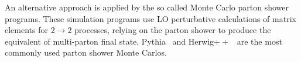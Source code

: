 An alternative approach is applied by the so called Monte Carlo parton shower programs. These simulation programs use LO perturbative calculations of matrix elements for $2 \rightarrow 2$ processes, relying on the parton shower to produce the equivalent of multi-parton final state.  {\sc Pythia}~\cite{PYTHIA6} and {\sc Herwig}$++$~\cite{HerwigPP} are the most commonly used parton shower Monte Carlos. %


